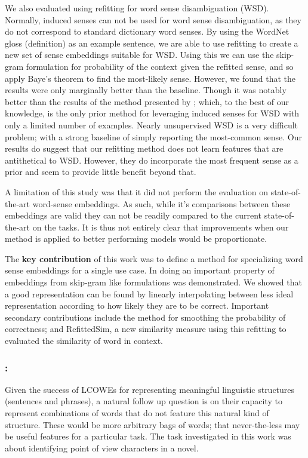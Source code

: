 \documentclass{book}
\begin{document}
We also evaluated using refitting for word sense disambiguation (WSD).
Normally, induced senses can not be used for word sense disambiguation, as they do not correspond to standard dictionary word senses.
By using the WordNet gloss (definition) as an example sentence, we are able to use refitting to create a new set of sense embeddings suitable for WSD.
Using this we can use the skip-gram formulation for probability of the context given the  refitted sense, and so apply Baye's theorem to find the most-likely sense.
However, we found that the results were only marginally better than the baseline.
Though it was notably better than the results of the method presented by \citet{agirre2006}; which, to the best of our knowledge, is the only prior method for leveraging induced senses for WSD with only a limited number of examples.
Nearly unsupervised WSD is a very difficult problem; with a strong baseline of simply reporting the most-common sense.
Our results do suggest that our refitting method does not learn features that are antithetical to WSD.
However, they do incorporate the most frequent sense as a prior and seem to provide little benefit beyond that.

A limitation of this study was that it did not perform the evaluation on state-of-the-art word-sense embeddings.
As such, while it's comparisons between these embeddings are valid they can not be readily compared to the current state-of-the-art on the tasks.
It is thus not entirely clear that improvements when our method is applied to better performing models would be proportionate.


The \textbf{key contribution} of this work was to define a method for specializing word sense embeddings for a single use case.
In doing an important property of embeddings from skip-gram like formulations was demonstrated.
We showed that a good representation can be found by linearly interpolating between less ideal representation according to how likely they are to be correct.
Important secondary contributions include the method for smoothing the probability of correctness;
and RefittedSim, a new similarity measure using this refitting to evaluated the similarity of word in context.


\subsubsection{: }

Given the success of LCOWEs for representing meaningful linguistic structures (sentences and phrases),
a natural follow up question is on their capacity to represent combinations of words that do not feature this natural kind of structure.
These would be more arbitrary bags of words; that never-the-less may be useful features for a particular task.
The task investigated in this work was about identifying point of view characters in a novel.
\end{document}
